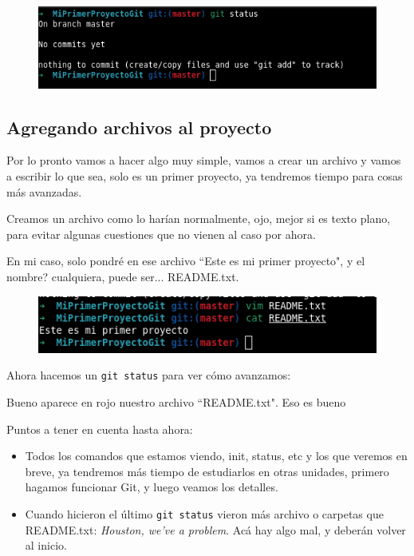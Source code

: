 \documentclass[a4paper]{article}
\begin{document}
\begin{figure}[H]
	\centering
	\includegraphics[width=0.7\linewidth]{img/miprimerproyecto3}
	\label{fig:miprimerproyecto3}
\end{figure}

\subsection{Agregando archivos al proyecto}

Por lo pronto vamos a hacer algo muy simple, vamos a crear un archivo
y vamos a escribir lo que sea, solo es un primer proyecto, ya tendremos
tiempo para cosas más avanzadas.

Creamos un archivo como lo harían normalmente, ojo, mejor si es texto plano,
para evitar algunas cuestiones que no vienen al caso por ahora.

En mi caso, solo pondré en ese archivo ``Este es mi primer proyecto", y el nombre?
cualquiera, puede ser... README.txt.

\begin{figure}[H]
	\centering
	\includegraphics[width=0.7\linewidth]{img/miprimerproyecto4}
	\label{fig:miprimerproyecto4}
\end{figure}

Ahora hacemos un \verb|git status| para ver cómo avanzamos:

Bueno aparece en rojo nuestro archivo ``README.txt". Eso es bueno

Puntos a tener en cuenta hasta ahora:

\begin{itemize}
	\item Todos los comandos que estamos viendo, init, status, etc y los que
	veremos en breve, ya tendremos más tiempo de estudiarlos en otras
	unidades, primero hagamos funcionar Git, y luego veamos los detalles.
	\item Cuando hicieron el último \verb|git status| vieron más archivo o
	carpetas que README.txt: \textit{Houston, we've a problem}. Acá hay algo mal, y
	deberán volver al inicio.
\end{itemize}
\end{document}
